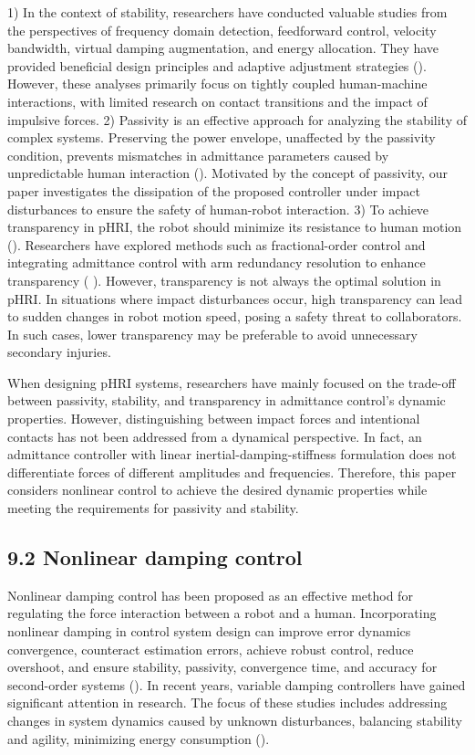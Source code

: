 1) In the context of stability, researchers have conducted valuable studies from the perspectives of frequency domain detection, feedforward control, velocity bandwidth, virtual damping augmentation, and energy allocation. They have provided beneficial design principles and adaptive adjustment strategies (\cite{dimeas2016online,keemink2018admittance,ferraguti2019variable}). However, these analyses primarily focus on tightly coupled human-machine interactions, with limited research on contact transitions and the impact of impulsive forces. 2) Passivity is an effective approach for analyzing the stability of complex systems. Preserving the power envelope, unaffected by the passivity condition, prevents mismatches in admittance parameters caused by unpredictable human interaction (\cite{ferraguti2015energy}). Motivated by the concept of passivity, our paper investigates the dissipation of the proposed controller under impact disturbances to ensure the safety of human-robot interaction. 3) To achieve transparency in pHRI, the robot should minimize its resistance to human motion (\cite{laghi2020unifying}). Researchers have explored methods such as fractional-order control and integrating admittance control with arm redundancy resolution to enhance transparency (\cite{sirintuna2020variable,aydin2021towards,kim2012admittance} ). However, transparency is not always the optimal solution in pHRI. In situations where impact disturbances occur, high transparency can lead to sudden changes in robot motion speed, posing a safety threat to collaborators. In such cases, lower transparency may be preferable to avoid unnecessary secondary injuries. 

When designing pHRI systems, researchers have mainly focused on the trade-off between passivity, stability, and transparency in admittance control's dynamic properties. However, distinguishing between impact forces and intentional contacts has not been addressed from a dynamical perspective. In fact, an admittance controller with linear inertial-damping-stiffness formulation does not differentiate forces of different amplitudes and frequencies. Therefore, this paper considers nonlinear control to achieve the desired dynamic properties while meeting the requirements for passivity and stability.

\subsection{9.2 Nonlinear damping control}
Nonlinear damping control has been proposed as an effective method for regulating the force interaction between a robot and a human. 
Incorporating nonlinear damping in control system design can improve error dynamics convergence, counteract estimation errors, achieve robust control, reduce overshoot, and ensure stability, passivity, convergence time, and accuracy for second-order systems (\cite{6202693,7954629,lai2014improving,ruderman2021optimal}). In recent years, variable damping controllers have gained significant attention in research. The focus of these studies includes addressing changes in system dynamics caused by unknown disturbances, balancing stability and agility, minimizing energy consumption (\cite{6809166,zahedi2021variable,zahedi2022user}).

